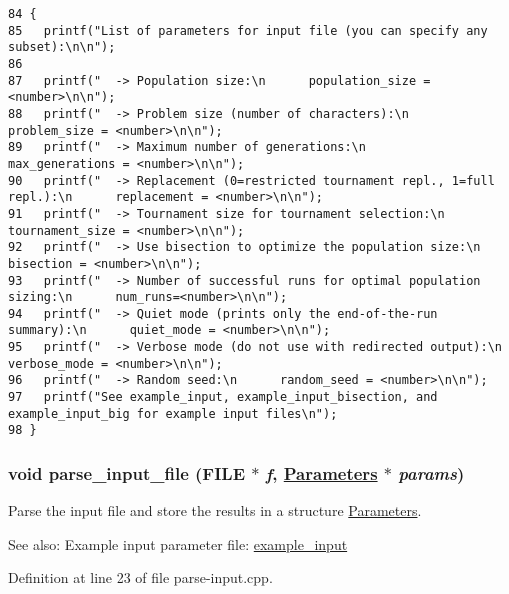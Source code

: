 \begin{Code}\begin{verbatim}84 {
85   printf("List of parameters for input file (you can specify any subset):\n\n");
86 
87   printf("  -> Population size:\n      population_size = <number>\n\n");
88   printf("  -> Problem size (number of characters):\n      problem_size = <number>\n\n");
89   printf("  -> Maximum number of generations:\n      max_generations = <number>\n\n");
90   printf("  -> Replacement (0=restricted tournament repl., 1=full repl.):\n      replacement = <number>\n\n");
91   printf("  -> Tournament size for tournament selection:\n      tournament_size = <number>\n\n");
92   printf("  -> Use bisection to optimize the population size:\n      bisection = <number>\n\n");
93   printf("  -> Number of successful runs for optimal population sizing:\n      num_runs=<number>\n\n");
94   printf("  -> Quiet mode (prints only the end-of-the-run summary):\n      quiet_mode = <number>\n\n");
95   printf("  -> Verbose mode (do not use with redirected output):\n      verbose_mode = <number>\n\n");
96   printf("  -> Random seed:\n      random_seed = <number>\n\n");
97   printf("See example_input, example_input_bisection, and example_input_big for example input files\n");
98 }
\end{verbatim}\end{Code}


\hypertarget{parse-input_8hpp_ecc496a88afbe998e2577dfe766dbd0e}{
\subsubsection[parse\_\-input\_\-file]{\setlength{\rightskip}{0pt plus 5cm}void parse\_\-input\_\-file (FILE $\ast$ {\em f}, \hyperlink{struct_parameters}{Parameters} $\ast$ {\em params})}}
\label{parse-input_8hpp_ecc496a88afbe998e2577dfe766dbd0e}


Parse the input file and store the results in a structure \hyperlink{struct_parameters}{Parameters}. 

\begin{Desc}
\item[See also:]Example input parameter file: \hyperlink{example__input-example}{example\_\-input} \end{Desc}


Definition at line 23 of file parse-input.cpp.

